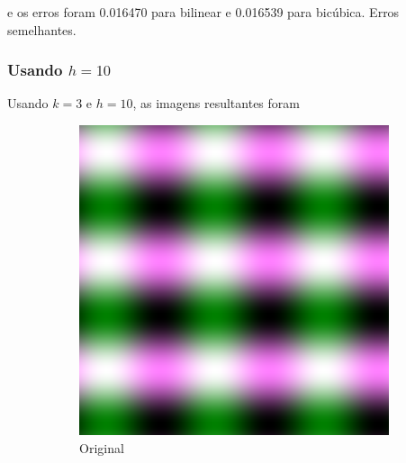 \documentclass{article}
\begin{document}
e os erros foram 0.016470 para bilinear e 0.016539 para bicúbica. Erros
semelhantes.

\subsubsection[Usando h=10]{Usando $h=10$}

Usando $k=3$ e $h=10$, as imagens resultantes foram

\begin{figure}[ht]
  \centering
  \begin{subfigure}{0.23\textwidth}
    \centering
    \includegraphics[width=\textwidth]{senoidal/senoidal.png}
    \caption{Original}
  \end{subfigure}%
  \hfill
  \begin{subfigure}{0.23\textwidth}
    \centering

\end{subfigure}
\end{figure}
\end{document}
